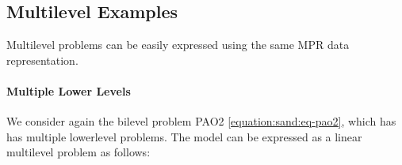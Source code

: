 \documentclass[letterpaper,10pt,english]{sphinxmanual}
\begin{document}
\subsection{Multilevel Examples}
\label{\detokenize{representations/mpr:multilevel-examples}}
Multilevel problems can be easily expressed using the same MPR data
representation.


\paragraph{Multiple Lower Levels}
\label{\detokenize{representations/mpr:multiple-lower-levels}}
We consider again the bilevel problem PAO2 \eqref{equation:sand:eq-pao2}, which has has
multiple lower\sphinxhyphen{}level problems.  The  model can be expressed as
a linear multilevel problem as follows:
\end{document}

